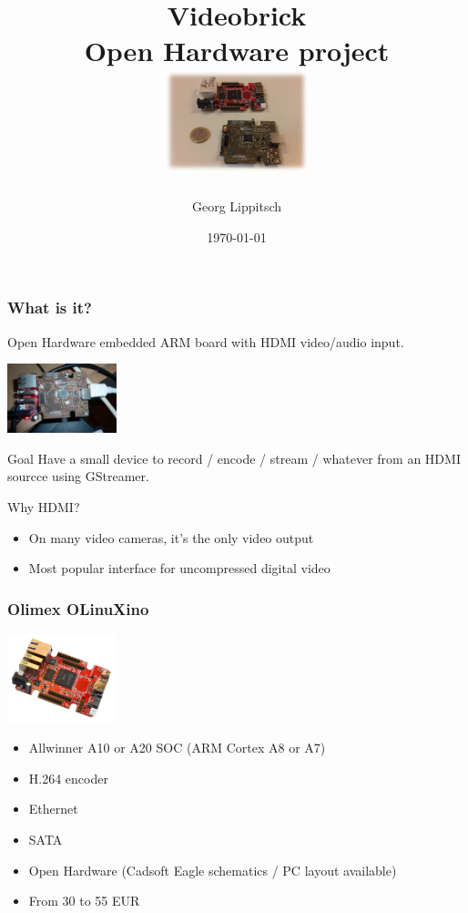 \documentclass{beamer}
\title{Videobrick \\ Open Hardware project \\ \includegraphics[width=160px]{title.jpg}}
\author{Georg Lippitsch}
\date{\today}
\begin{document}
\maketitle
 
\begin{frame} %

  \frametitle{What is it?} %
  Open Hardware embedded ARM board with HDMI video/audio input.

  \begin{center}
    \includegraphics[width=120px]{vbrick.jpg}
  \end{center}

  \begin{block}{Goal}
    Have a small device to record / encode / stream / whatever from an HDMI sourcce using GStreamer.
  \end{block}

  \begin{block}{Why HDMI?}
    \begin{itemize}
    \item On many video cameras, it's the only video output
    \item Most popular interface for uncompressed digital video
    \end{itemize}
  \end{block}

\end{frame}

\begin{frame} %

  \frametitle{Olimex OLinuXino}

  \begin{center}
    \includegraphics[width=120px]{A10-OLinuXino-LIME-1.jpg}
  \end{center}

  \begin{itemize}
  \item Allwinner A10 or A20 SOC (ARM Cortex A8 or A7)
  \item H.264 encoder
  \item Ethernet
  \item SATA
  \item Open Hardware (Cadsoft Eagle schematics / PC layout available)
  \item From 30 to 55 EUR
  \end{itemize}

\end{frame}
\end{document}
